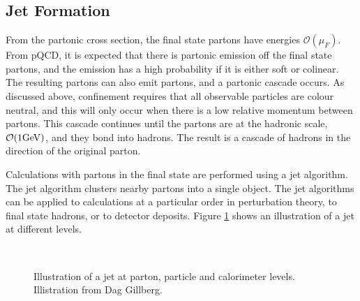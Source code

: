 \subsection{Jet Formation}

From the partonic cross section, the final state partons have energies $\mathcal{O}(\mu_{F})$.
From pQCD, it is expected that there is partonic emission off the final state partons, and the emission has a high probability if it is either soft or colinear. 
The resulting partons can also emit partons, and a partonic cascade occurs.
As discussed above, confinement requires that all observable particles are colour neutral, and this will only occur when there is a low relative momentum between partons.
This cascade continues until the partons are at the hadronic scale, $\mathcal{O}(1\rm GeV)$, and they bond into hadrons.
The result is a cascade of hadrons in the direction of the original parton.

Calculations with partons in the final state are performed using a jet algorithm.  
The jet algorithm clusters nearby partons into a single object.
The jet algorithms can be applied to calculations at a particular order in perturbation theory, to final state hadrons, or to detector deposits.
Figure \ref{Theory:InitJet} shows an illustration of a jet at different levels.


\begin{figure}
\centering
\mbox{
                              }
\caption[Jets at parton, particle and calorimeter levels]{
Illustration of a jet at parton, particle and calorimeter levels. 
Illistration from Dag Gillberg.
\label{Theory:InitJet}}
\end{figure}


